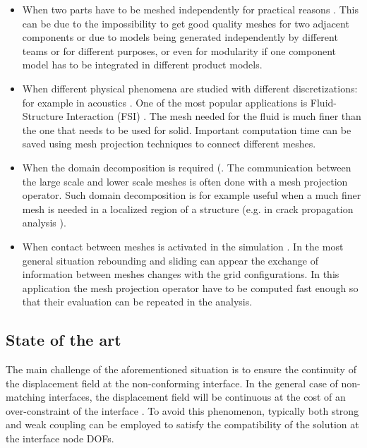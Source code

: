  \begin{itemize}
     \item When two parts have to be meshed independently for practical reasons \cite{barlow1982constraint,quiroz1995non}. This can be due to the impossibility to get good quality meshes for two adjacent components or due to models being generated independently by different teams or for different purposes, or even for modularity if one component model has to be integrated in different product models. 
     \item When different physical phenomena are studied with different discretizations: for example in acoustics \cite{flemisch2012non}. One of the most popular applications is Fluid-Structure Interaction (FSI) \cite{de2007review,de2008comparison,hou2012numerical,beckert2001multivariate,cebrali1997conservative,lohner1998fluid,farhat1998load}. The mesh needed for the fluid is much finer than the one that needs to be used for solid. Important computation time can be saved using mesh projection techniques to connect different meshes.
     \item When the domain decomposition is required (\cite{brandt2002multiscale,feyel2000fe,duval2016non,farhat1991method,mandel1993balancing}. The communication between the large scale and lower scale meshes is often done with a mesh projection operator. Such domain decomposition is for example useful when a much finer mesh is needed in a localized region of a structure (e.g. in crack propagation analysis \cite{duval2016non,lloberas2012micro,lloberas2012multiscale}).
     \item When contact between meshes is activated in the simulation \cite{wriggers1995finite,shillor20047,sofonea2005analysis,christensen1998formulation}. In the most general situation rebounding and sliding can appear the exchange of information between meshes changes  with the grid configurations. In this application the mesh projection operator have to be computed fast enough so that their evaluation can be repeated in the analysis.
 \end{itemize}
 \subsection{State of the art}
 The main challenge of the aforementioned situation is to ensure the continuity of the displacement field at the non-conforming interface. In the general case of non-matching interfaces, the displacement field will be continuous at the cost of an over-constraint of the interface \cite{rixen1997substructuring}. To avoid this phenomenon, typically both strong and weak coupling can be employed to satisfy the compatibility of the solution at the interface node DOFs.
